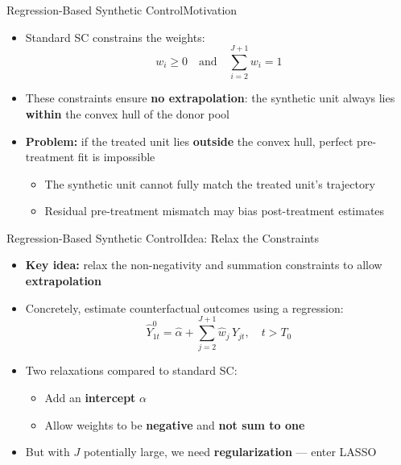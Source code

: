 \documentclass[hyperref={pdfpagelabels=false}]{beamer}
\begin{document}
\begin{frame}{Regression-Based Synthetic Control}{Motivation}
\begin{itemize}
	\item Standard SC constrains the weights:
	\begin{equation*}
		w_i \geq 0
		\quad\text{and}\quad
		\sum_{i=2}^{J+1} w_i = 1
	\end{equation*}
	\vspace{0.2cm}
	\item These constraints ensure \textbf{no extrapolation}: the synthetic unit always lies \textbf{within} the convex hull of the donor pool
	\vspace{0.2cm}
	\item \textbf{Problem:} if the treated unit lies \textbf{outside} the convex hull, perfect pre-treatment fit is impossible
	\vspace{0.2cm}
	\begin{itemize}
		\item The synthetic unit cannot fully match the treated unit's trajectory
		\vspace{0.1cm}
		\item Residual pre-treatment mismatch may bias post-treatment estimates
	\end{itemize}
\end{itemize}
\end{frame}

\begin{frame}{Regression-Based Synthetic Control}{Idea: Relax the Constraints}
\begin{itemize}
	\item \textbf{Key idea:} relax the non-negativity and summation constraints to allow \textbf{extrapolation}
	\vspace{0.3cm}
	\item Concretely, estimate counterfactual outcomes using a regression:
	\begin{equation*}
		\hat{Y}^{0}_{1t} = \hat{\alpha} + \sum_{j=2}^{J+1}\hat{w}_j\,Y_{jt},
		\quad t > T_0
	\end{equation*}
	\vspace{0.2cm}
	\item Two relaxations compared to standard SC:
	\vspace{0.1cm}
	\begin{itemize}
		\item Add an \textbf{intercept} $\alpha$
		\vspace{0.2cm}
		\item Allow weights to be \textbf{negative} and \textbf{not sum to one}
	\end{itemize}
	\vspace{0.3cm}
	\item But with $J$ potentially large, we need \textbf{regularization} --- enter LASSO
\end{itemize}
\end{frame}
\end{document}
